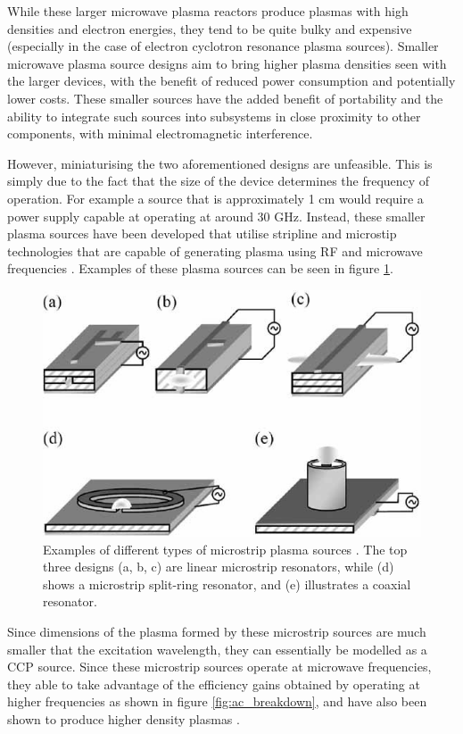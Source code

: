While these larger microwave plasma reactors produce plasmas with high densities and electron energies, they tend to be quite bulky and expensive (especially in the case of electron cyclotron resonance plasma sources). Smaller microwave plasma source designs aim to bring higher plasma densities seen with the larger devices, with the benefit of reduced power consumption and potentially lower costs. These smaller sources have the added benefit of portability and the ability to integrate such sources into subsystems in close proximity to other components, with minimal electromagnetic interference.

However, miniaturising the two aforementioned designs are unfeasible. This is simply due to the fact that the size of the device determines the frequency of operation. For example a source that is approximately 1 cm would require a power supply capable at operating at around 30 GHz. Instead, these smaller plasma sources have been developed that utilise stripline and microstip technologies that are capable of generating plasma using RF and microwave frequencies \cite{Pollak2007, Iza2003}. Examples of these plasma sources can be seen in figure \ref{fig:microstrip_microwave_discharge}. 

\begin{figure}[h!]
	\centering
	\includegraphics[width=0.8\linewidth]{chapter_2/figures/microstrip_microwave_discharge.jpg}
	\caption{Examples of different types of microstrip plasma sources \cite{Iza2008}. The top three designs (a, b, c) are linear microstrip resonators, while (d) shows a microstrip split-ring resonator, and (e) illustrates a coaxial resonator.}
	\label{fig:microstrip_microwave_discharge}
\end{figure} 

Since dimensions of the plasma formed by these microstrip sources are much smaller that the excitation wavelength, they can essentially be modelled as a CCP source. Since these microstrip sources operate at microwave frequencies, they able to take advantage of the efficiency gains obtained by operating at higher frequencies as shown in figure \ref{fig:ac_breakdown}, and have also been shown to produce higher density plasmas \cite{Surendra1998}. 

